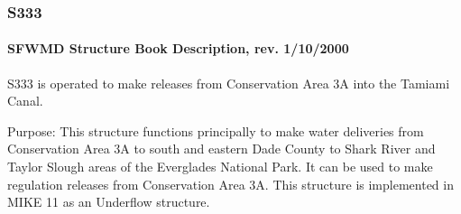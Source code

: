 %
%


\clearpage
\subsubsection{S333}

\paragraph{SFWMD Structure Book Description, rev. 1/10/2000}
S333 is operated to make releases from Conservation Area 3A into the Tamiami Canal.

Purpose:
This structure functions principally to make water deliveries from Conservation Area 3A to south and eastern Dade County to Shark River and Taylor Slough areas of the Everglades National Park. It can be used to make regulation releases from Conservation Area 3A. This structure is implemented in MIKE 11 as an Underflow structure.

